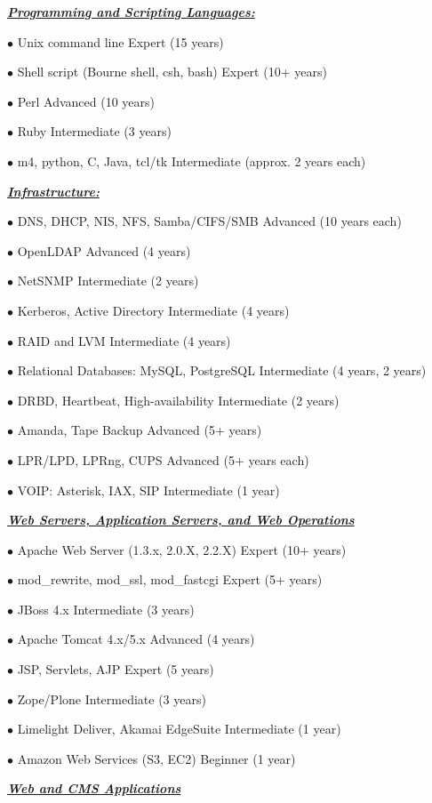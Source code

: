 \documentclass{article}
\newcommand{\skillset}[1]{{ \underline{\textbf{\emph{#1}}}\\  \nopagebreak }}
\newcommand{\skill}[2]{{$\bullet$ #1 \hfill #2 }}
\begin{document}
\skillset{Programming and Scripting Languages: }

\skill{Unix command line}{Expert (15 years)}

\skill{Shell script (Bourne shell, csh, bash)}{Expert (10+ years)}

\skill{Perl}{Advanced (10 years)}

\skill{Ruby}{Intermediate (3 years)}

\skill{m4, python, C, Java, tcl/tk}{Intermediate (approx. 2 years each)}



\skillset{Infrastructure: }

\skill{DNS, DHCP, NIS, NFS, Samba/CIFS/SMB}{Advanced (10 years each)}

\skill{OpenLDAP}{Advanced (4 years)}

\skill{NetSNMP}{Intermediate (2 years)}

\skill{Kerberos, Active Directory}{Intermediate (4 years)}

\skill{RAID and LVM}{Intermediate (4 years)}

\skill{Relational Databases: MySQL, PostgreSQL}{Intermediate (4 years, 2 years)}

\skill{DRBD, Heartbeat, High-availability}{Intermediate (2 years)}

\skill{Amanda, Tape Backup}{Advanced (5+ years)}

\skill{LPR/LPD, LPRng, CUPS}{Advanced (5+ years each)}

\skill{VOIP: Asterisk, IAX, SIP}{Intermediate (1 year)}



\skillset{Web Servers, Application Servers, and Web Operations}

\skill{Apache Web Server (1.3.x, 2.0.X, 2.2.X)}{Expert (10+ years)}

\skill{mod\_rewrite, mod\_ssl, mod\_fastcgi}{Expert (5+ years)}

\skill{JBoss 4.x}{Intermediate (3 years)}

\skill{Apache Tomcat 4.x/5.x}{Advanced (4 years)}

\skill{JSP, Servlets, AJP}{Expert (5 years)}

\skill{Zope/Plone}{Intermediate (3 years)}

\skill{Limelight Deliver, Akamai EdgeSuite}{Intermediate (1 year)}

\skill{Amazon Web Services (S3, EC2)}{Beginner (1 year)}



\skillset{Web and CMS Applications}
\end{document}
